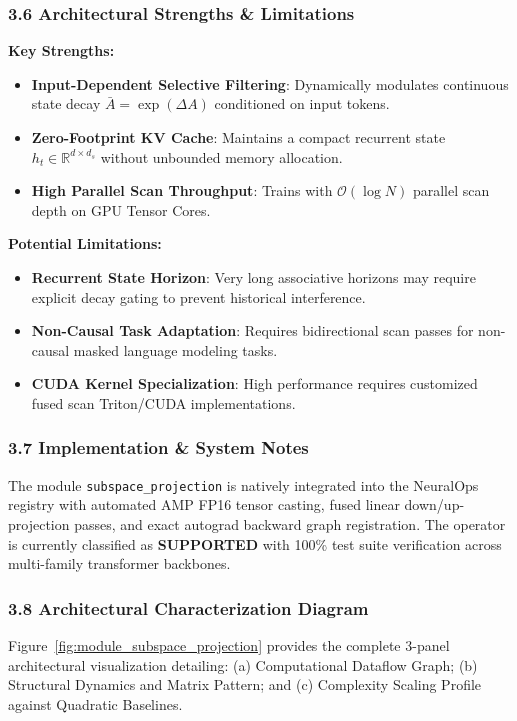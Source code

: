 \subsubsection*{3.6 Architectural Strengths \& Limitations}
\textbf{Key Strengths:}
\begin{itemize}
    \item \textbf{Input-Dependent Selective Filtering}: Dynamically modulates continuous state decay $\bar{A} = \exp(\Delta A)$ conditioned on input tokens.
    \item \textbf{Zero-Footprint KV Cache}: Maintains a compact recurrent state $h_t \in \mathbb{R}^{d \times d_s}$ without unbounded memory allocation.
    \item \textbf{High Parallel Scan Throughput}: Trains with $\mathcal{O}(\log N)$ parallel scan depth on GPU Tensor Cores.
\end{itemize}

\textbf{Potential Limitations:}
\begin{itemize}
    \item \textbf{Recurrent State Horizon}: Very long associative horizons may require explicit decay gating to prevent historical interference.
    \item \textbf{Non-Causal Task Adaptation}: Requires bidirectional scan passes for non-causal masked language modeling tasks.
    \item \textbf{CUDA Kernel Specialization}: High performance requires customized fused scan Triton/CUDA implementations.
\end{itemize}

\subsubsection*{3.7 Implementation \& System Notes}
The module \texttt{subspace\_projection} is natively integrated into the NeuralOps registry with automated AMP FP16 tensor casting, fused linear down/up-projection passes, and exact autograd backward graph registration. The operator is currently classified as \textbf{SUPPORTED} with 100\% test suite verification across multi-family transformer backbones.

\subsubsection*{3.8 Architectural Characterization Diagram}
Figure~\ref{fig:module_subspace_projection} provides the complete 3-panel architectural visualization detailing: (a) Computational Dataflow Graph; (b) Structural Dynamics and Matrix Pattern; and (c) Complexity Scaling Profile against Quadratic Baselines.

